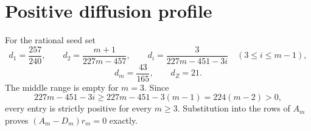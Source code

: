 \section*{Positive diffusion profile}
For the rational seed set
\[
d_1=\frac{257}{240},
\qquad
d_2=\frac{m+1}{227m-457},
\qquad
d_i=\frac3{227m-451-3i}\quad(3\le i\le m-1),
\]
\[
d_m=\frac{43}{165},
\qquad d_Z=21.
\]
The middle range is empty for $m=3$.  Since
\[
227m-451-3i\ge227m-451-3(m-1)=224(m-2)>0,
\]
every entry is strictly positive for every $m\ge3$.  Substitution into the
rows of $A_m$ proves $(A_m-D_m)r_m=0$ exactly.

